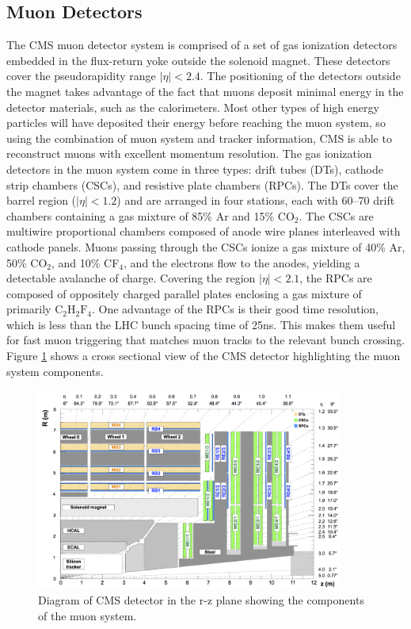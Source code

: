 \subsection{Muon Detectors}
The CMS muon detector system is comprised of a set of gas ionization detectors embedded in the flux-return yoke outside the solenoid magnet. 
These detectors cover the pseudorapidity range $|\eta| < 2.4$. The positioning of the detectors outside the magnet takes advantage of the fact that muons deposit minimal energy in the detector 
materials, such as the calorimeters. Most other types of high energy particles will have deposited their energy before reaching the muon system, so using the combination of muon system and tracker information, CMS is able to reconstruct muons with excellent momentum resolution. The gas ionization detectors in the muon system come in three types: drift tubes (DTs), cathode strip chambers (CSCs), and 
resistive plate chambers (RPCs). The DTs cover the barrel region ($|\eta| < 1.2$) and are arranged in four stations, each with 60--70 drift chambers containing a gas mixture of 85\% Ar and 15\% CO$_2$.
The CSCs are multiwire proportional chambers composed of anode wire planes interleaved with cathode panels. Muons passing through the CSCs ionize a gas mixture of 40\% Ar, 50\% CO$_2$, and 10\% CF$_4$, 
and the electrons flow to the anodes, yielding a detectable avalanche of charge. Covering the region $|\eta| < 2.1$, the RPCs are composed of oppositely charged parallel plates enclosing a gas mixture 
of primarily $\mathrm{C}_2\mathrm{H}_2\mathrm{F}_4$. One advantage of the RPCs is their good time resolution, which is less than the LHC bunch spacing time of 25ns. This makes them useful for fast muon triggering that matches
muon tracks to the relevant bunch crossing. Figure \ref{fig:muon_system} shows a cross sectional view of the CMS detector highlighting the muon system components. 

\begin{figure}
  \centering
   \includegraphics[width=0.9\textwidth]{fig/experiment/detector/muon_sys_r-z.png}
	\caption{Diagram of CMS detector in the r-z plane showing the components of the muon system.}
	\label{fig:muon_system}
\end{figure}

